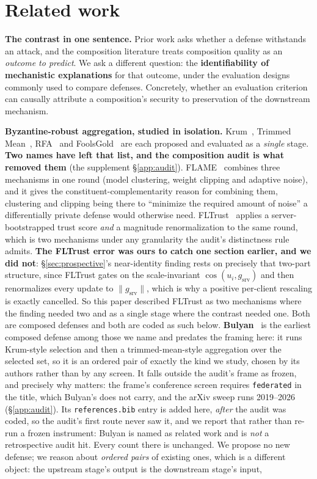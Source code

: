 \documentclass{article}
\begin{document}
\section{Related work}
\label{sec:related}
\label{app:related}

\noindent\textbf{The contrast in one sentence.} Prior work asks whether a defense withstands an attack, and the composition literature treats composition quality as an \emph{outcome to predict}. We ask a different question: the \textbf{identifiability of mechanistic explanations} for that outcome, under the evaluation designs commonly used to compare defenses. Concretely, whether an evaluation criterion can causally attribute a composition's security to preservation of the downstream mechanism.

\textbf{Byzantine-robust aggregation, studied in isolation.} Krum~\citep{blanchard2017machine}, Trimmed Mean~\citep{yin2018byzantine}, RFA~\citep{pillutla2022robust} and FoolsGold~\citep{fung2020foolsgold} are each proposed and evaluated as a \emph{single} stage. \textbf{Two names have left that list, and the composition audit is what removed them} (the supplement §\ref{app:audit}). FLAME~\citep{nguyen2022flame} combines three mechanisms in one round (model clustering, weight clipping and adaptive noise), and it gives the constituent-complementarity reason for combining them, clustering and clipping being there to ``minimize the required amount of noise'' a differentially private defense would otherwise need. FLTrust~\citep{cao2021fltrust} applies a server-bootstrapped trust score \emph{and} a magnitude renormalization to the same round, which is two mechanisms under any granularity the audit's distinctness rule admits. \textbf{The FLTrust error was ours to catch one section earlier, and we did not}: §\ref{sec:prospective}'s near-identity finding rests on precisely that two-part structure, since FLTrust gates on the scale-invariant $\cos(u_i, g_{\mathrm{srv}})$ and then renormalizes every update to $\|g_{\mathrm{srv}}\|$, which is why a positive per-client rescaling is exactly cancelled. So this paper described FLTrust as two mechanisms where the finding needed two and as a single stage where the contrast needed one. Both are composed defenses and both are coded as such below. \textbf{Bulyan}~\citep{elmhamdi2018hidden} is the earliest composed defense among those we name and predates the framing here: it runs Krum-style selection and then a trimmed-mean-style aggregation over the selected set, so it is an ordered pair of exactly the kind we study, chosen by its authors rather than by any screen. It falls outside the audit's frame as frozen, and precisely why matters: the frame's conference screen requires \texttt{federated} in the title, which Bulyan's does not carry, and the arXiv sweep runs 2019--2026 (§\ref{app:audit}). Its \texttt{references.bib} entry is added here, \emph{after} the audit was coded, so the audit's first route never saw it, and we report that rather than re-run a frozen instrument: Bulyan is named as related work and is \emph{not} a retrospective audit hit. Every count there is unchanged. We propose no new defense; we reason about \emph{ordered pairs} of existing ones, which is a different object: the upstream stage's output is the downstream stage's input, 
\end{document}
